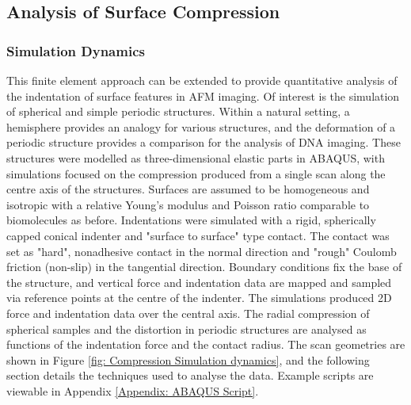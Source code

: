 \subsection{Analysis of Surface Compression \label{Chapter 2: Quantitative Analysis of Surface Compression}}

\subsubsection{Simulation Dynamics}
This finite element approach can be extended to provide quantitative analysis of the indentation of surface features in AFM imaging. Of interest is the simulation of spherical and simple periodic structures. Within a natural setting, a hemisphere provides an analogy for various structures, and the deformation of a periodic structure provides a comparison for the analysis of DNA imaging. These structures were modelled as three-dimensional elastic parts in ABAQUS, with simulations focused on the compression produced from a single scan along the centre axis of the structures. Surfaces are assumed to be homogeneous and isotropic with a relative Young's modulus and Poisson ratio comparable to biomolecules as before. Indentations were simulated with a rigid, spherically capped conical indenter and "surface to surface" type contact. The contact was set as "hard", nonadhesive contact in the normal direction and "rough" Coulomb friction (non-slip) in the tangential direction. Boundary conditions fix the base of the structure, and vertical force and indentation data are mapped and sampled via reference points at the centre of the indenter. The simulations produced 2D force and indentation data over the central axis. The radial compression of spherical samples and the distortion in periodic structures are analysed as functions of the indentation force and the contact radius. The scan geometries are shown in Figure \ref{fig: Compression Simulation dynamics}, and the following section details the techniques used to analyse the data. Example scripts are viewable in Appendix \ref{Appendix: ABAQUS Script}.


